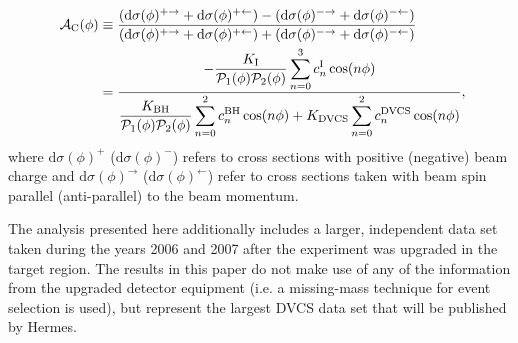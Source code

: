 \begin{align}
\hspace{0.5cm}\mathcal{A}_{\textrm{C}}(\phi) &\equiv  
\frac{(\textrm{d}\sigma(\phi)^{+\rightarrow} +
\textrm{d}\sigma(\phi)^{+\leftarrow}) -
(\textrm{d}\sigma(\phi)^{-\rightarrow}
+ \textrm{d}\sigma(\phi)^{-\leftarrow})}{(\textrm{d}\sigma(\phi)^{+\rightarrow}
+
\textrm{d}\sigma(\phi)^{+\leftarrow}) +
(\textrm{d}\sigma(\phi)^{-\rightarrow}
+ \textrm{d}\sigma(\phi)^{-\leftarrow})}&    \nonumber \\
&=\dfrac{{-\dfrac{K_{\textrm{I}}}{\mathcal{P}_{1}(\phi)\mathcal{P}_{2}(\phi)}
\displaystyle\sum_{n=0}^3
c_{n}^{\textrm{I}}\cos(n\phi)}}{\dfrac{K_{\textrm{BH}}}{\mathcal{P}_{1}
(\phi)\mathcal{P}_
{2}(\phi)}
\displaystyle\sum_{n=0}^2
c_{n}^{\textrm{BH}}\cos(n\phi) + 
K_{\textrm{DVCS}}\displaystyle\sum_{n=0}^2 c_{n}^{\textrm{DVCS}}\cos(n\phi)} ,&
\label{e:ac}
\end{align}
where $\textrm{d}\sigma(\phi)^+$ ($\textrm{d}\sigma(\phi)^-$) refers to
cross sections with positive (negative) beam charge and
$\textrm{d}\sigma(\phi)^\rightarrow$ ($\textrm{d}\sigma(\phi)^\leftarrow$) refer
to cross sections taken with beam spin parallel (anti-parallel) to the
beam momentum.

The analysis presented here additionally includes a larger,
independent data set taken during the years 2006 and 2007 after the
experiment was upgraded in the target region. The results in this paper do not make use of any of the information from the
upgraded detector equipment (i.e. a missing-mass technique for event selection is used), but represent the largest DVCS data set that will
be published by H{\sc ermes}.
